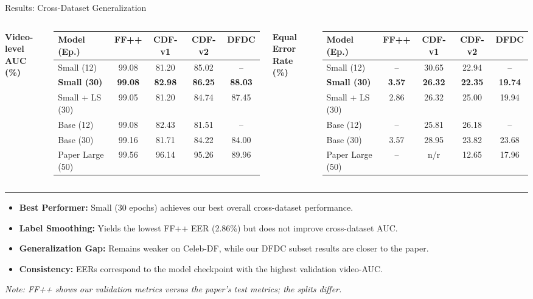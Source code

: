 \documentclass[aspectratio=169,10pt]{beamer}
\begin{document}
\begin{frame}{Results: Cross-Dataset Generalization}
\scriptsize
\begin{columns}[T,onlytextwidth]
\centering
\textbf{Video-level AUC (\%)}
\vspace{3pt}
\begin{tabular}{|l|c|c|c|c|}
\hline
Model (Ep.) & FF++ & CDF-v1 & CDF-v2 & DFDC\\\hline
Small (12) & 99.08 & 81.20 & 85.02 & --\\
\textbf{Small (30)} & \textbf{99.08} & \textbf{82.98} & \textbf{86.25} & \textbf{88.03}\\
Small + LS (30) & 99.05 & 81.20 & 84.74 & 87.45\\
Base (12) & 99.08 & 82.43 & 81.51 & --\\
Base (30) & 99.16 & 81.71 & 84.22 & 84.00\\
Paper Large (50) & 99.56 & 96.14 & 95.26 & 89.96\\\hline
\end{tabular}
\centering
\textbf{Equal Error Rate (\%)}
\vspace{3pt}
\begin{tabular}{|l|c|c|c|c|}
\hline
Model (Ep.) & FF++ & CDF-v1 & CDF-v2 & DFDC\\\hline
Small (12) & -- & 30.65 & 22.94 & --\\
\textbf{Small (30)} & \textbf{3.57} & \textbf{26.32} & \textbf{22.35} & \textbf{19.74}\\
Small + LS (30) & 2.86 & 26.32 & 25.00 & 19.94\\
Base (12) & -- & 25.81 & 26.18 & --\\
Base (30) & 3.57 & 28.95 & 23.82 & 23.68\\
Paper Large (50) & -- & n/r & 12.65 & 17.96\\\hline
\end{tabular}
\end{columns}
\vspace{8pt}
\hrule
\vspace{6pt}
\footnotesize
\begin{itemize}
\item \textbf{Best Performer:} Small (30 epochs) achieves our best overall cross-dataset performance.
\item \textbf{Label Smoothing:} Yields the lowest FF++ EER (2.86\%) but does not improve cross-dataset AUC.
\item \textbf{Generalization Gap:} Remains weaker on Celeb-DF, while our DFDC subset results are closer to the paper.
\item \textbf{Consistency:} EERs correspond to the model checkpoint with the highest validation video-AUC.
\end{itemize}
\vspace{4pt}
\centering
\scriptsize
\textit{Note: FF++ shows our validation metrics versus the paper's test metrics; the splits differ.}
\end{frame}
\end{document}

